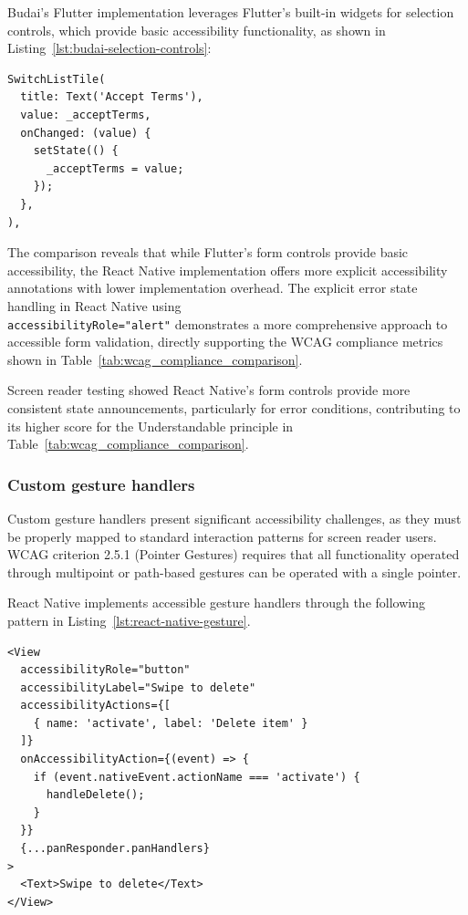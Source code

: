Budai's Flutter implementation leverages Flutter's built-in widgets for selection controls, which provide basic accessibility functionality, as shown in Listing~\ref{lst:budai-selection-controls}:

\begin{lstlisting}[style=DartStyle, caption=Selection controls in Budai's Flutter code, label=lst:budai-selection-controls]
SwitchListTile(
  title: Text('Accept Terms'),
  value: _acceptTerms,
  onChanged: (value) {
    setState(() {
      _acceptTerms = value;
    });
  },
),
\end{lstlisting}

\pagebreak

The comparison reveals that while Flutter's form controls provide basic accessibility, the React Native implementation offers more explicit accessibility annotations with lower implementation overhead. The explicit error state handling in React Native using \\ \texttt{accessibilityRole="alert"} demonstrates a more comprehensive approach to accessible form validation, directly supporting the WCAG compliance metrics shown in Table~\ref{tab:wcag_compliance_comparison}.

Screen reader testing showed React Native's form controls provide more consistent state announcements, particularly for error conditions, contributing to its higher score for the Understandable principle in Table~\ref{tab:wcag_compliance_comparison}.

\subsubsection{Custom gesture handlers}
\label{subsubsec:gesture-handlers}

Custom gesture handlers present significant accessibility challenges, as they must be properly mapped to standard interaction patterns for screen reader users. WCAG criterion 2.5.1 (Pointer Gestures) requires that all functionality operated through multipoint or path-based gestures can be operated with a single pointer.

React Native implements accessible gesture handlers through the following pattern in Listing~\ref{lst:react-native-gesture}.

\begin{lstlisting}[style=ReactNativeStyle, caption=Accessible gesture handler in React Native, label=lst:react-native-gesture]
<View
  accessibilityRole="button"
  accessibilityLabel="Swipe to delete"
  accessibilityActions={[
    { name: 'activate', label: 'Delete item' }
  ]}
  onAccessibilityAction={(event) => {
    if (event.nativeEvent.actionName === 'activate') {
      handleDelete();
    }
  }}
  {...panResponder.panHandlers}
>
  <Text>Swipe to delete</Text>
</View>
\end{lstlisting}

